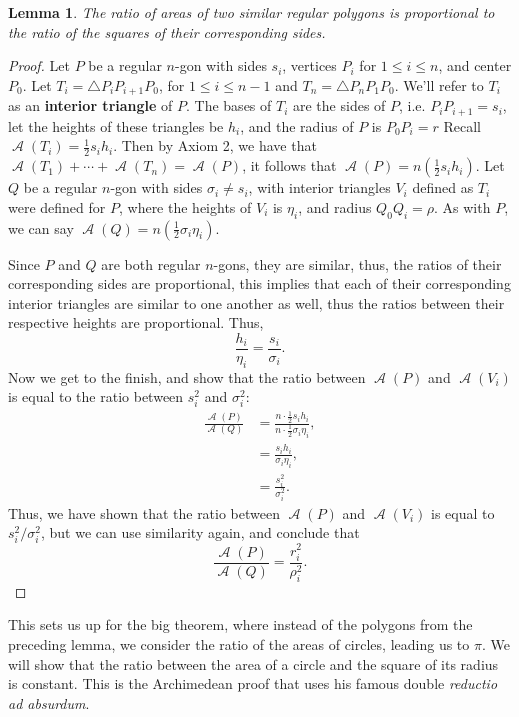 \documentclass[letterpaper, 12pt]{amsart}
\DeclareMathOperator{\A}{\mathcal{A}}
\newtheorem{lemma}[thm]{Lemma}
\theoremstyle{definition}  %
\begin{document}
		\begin{lemma}
		The ratio of areas of two similar regular polygons is proportional to the ratio of the squares of their corresponding sides.
		\end{lemma}
		\begin{proof}
		Let $P$ be a regular $n$-gon with sides $s_{i}$, vertices $P_{i}$ for $1 \leq i \leq n$, and center $P_{0}$.
		Let $T_{i} = \triangle P_{i}P_{i+1}P_{0}$, for $1 \leq i \leq n - 1$ and $T_{n} = \triangle P_{n}P_{1}P_{0}$.
		We'll refer to $T_{i}$ as an \textbf{interior triangle} of $P$.
		The bases of $T_{i}$ are the sides of $P$, i.e. $P_{i}P_{i+1} = s_{i}$, let the heights of these triangles be $h_{i}$, and the radius of $P$ is $P_{0}P_{i} = r$
		Recall $\A(T_{i}) = \tfrac{1}{2}s_{i}h_{i}$.
		Then by Axiom 2, we have that $\A(T_{1}) + \cdots + \A(T_{n}) = \A(P)$, it follows that $\A(P) = n\left( \tfrac{1}{2}s_{i}h_{i} \right)$.
		Let $Q$ be a regular $n$-gon with sides $\sigma_{i} \neq s_{i}$, with interior triangles $V_{i}$ defined as $T_{i}$ were defined for $P$, where the heights of $V_{i}$ is $\eta_{i}$, and radius $Q_{0}Q_{i} = \rho$.
		As with $P$, we can say $\A(Q) = n(\tfrac{1}{2} \sigma_{i}\eta_{i})$.

		Since $P$ and $Q$ are both regular $n$-gons, they are similar, thus, the ratios of their corresponding sides are proportional, this implies that each of their corresponding interior triangles are similar to one another as well, thus the ratios between their respective heights are proportional.
		Thus, $$\frac{h_{i}}{\eta_{i}} = \frac{s_{i}}{\sigma_{i}}.$$
		Now we get to the finish, and show that the ratio between $\A(P)$ and $\A(V_{i})$ is equal to the ratio between $s_{i}^{2}$ and $\sigma_{i}^{2}$:
			\begin{align*}
			\frac{\A(P)}{\A(Q)} &= \frac{n \cdot \tfrac{1}{2}s_{i}h_{i}}{n \cdot \tfrac{1}{2}\sigma_{i}\eta_{i}}, \\
			&= \frac{s_{i} h_{i}}{\sigma_{i} \eta_{i}}, \\
			&= \frac{s_{i}^{2}}{\sigma_{i}^{2}}.
			\end{align*}
		Thus, we have shown that the ratio between $\A(P)$ and $\A(V_{i})$ is equal to $s_{i}^{2}/\sigma_{i}^{2}$, but we can use similarity again, and conclude that $$\frac{\A(P)}{\A(Q)} = \frac{r_{i}^{2}}{\rho_{i}^{2}}.$$
		\end{proof}

		This sets us up for the big theorem, where instead of the polygons from the preceding lemma, we consider the ratio of the areas of circles, leading us to $\pi$.
		We will show that the ratio between the area of a circle and the square of its radius is constant.
		This is the Archimedean proof that uses his famous double \textit{reductio ad absurdum}.
\end{document}
